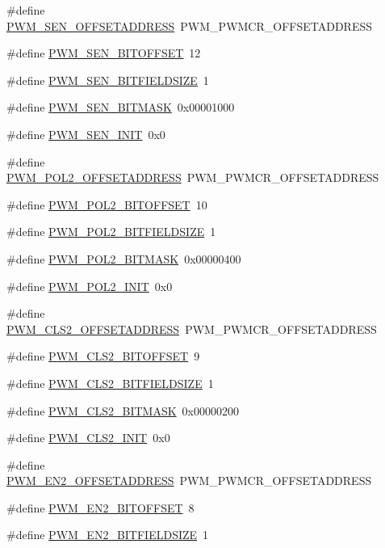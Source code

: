 \begin{DoxyCompactItemize}
\#define \hyperlink{a00565_a1b7f936a7649c7f0768376f5b1708791}{PWM\_\-SEN\_\-OFFSETADDRESS}~PWM\_\-PWMCR\_\-OFFSETADDRESS
\item 
\#define \hyperlink{a00565_a04ad96c43a0a475b6b58512e3a2751f1}{PWM\_\-SEN\_\-BITOFFSET}~12
\item 
\#define \hyperlink{a00565_af0d8ffbf5f63bfcce2096cb6647e6008}{PWM\_\-SEN\_\-BITFIELDSIZE}~1
\item 
\#define \hyperlink{a00565_a1c3b561c85f49b7baf11499691b807f7}{PWM\_\-SEN\_\-BITMASK}~0x00001000
\item 
\#define \hyperlink{a00565_a6320df8f16adebd9db7d8814d6eec919}{PWM\_\-SEN\_\-INIT}~0x0
\item 
\#define \hyperlink{a00565_a2e02d894047e60f171b47ce5c119b22e}{PWM\_\-POL2\_\-OFFSETADDRESS}~PWM\_\-PWMCR\_\-OFFSETADDRESS
\item 
\#define \hyperlink{a00565_abdd5c3d9c594895666d8876f4fa69d64}{PWM\_\-POL2\_\-BITOFFSET}~10
\item 
\#define \hyperlink{a00565_a747574ed13e6904f21e60943be324cdc}{PWM\_\-POL2\_\-BITFIELDSIZE}~1
\item 
\#define \hyperlink{a00565_aa306f679ffafcc67897c133927dc4910}{PWM\_\-POL2\_\-BITMASK}~0x00000400
\item 
\#define \hyperlink{a00565_aa558c9f963219dc5822698b93ef4f6d6}{PWM\_\-POL2\_\-INIT}~0x0
\item 
\#define \hyperlink{a00565_ad706dc65d2a9dfe96eea06384d13351f}{PWM\_\-CLS2\_\-OFFSETADDRESS}~PWM\_\-PWMCR\_\-OFFSETADDRESS
\item 
\#define \hyperlink{a00565_ae94efecdd4ec42d1aadc52684c9f2bf2}{PWM\_\-CLS2\_\-BITOFFSET}~9
\item 
\#define \hyperlink{a00565_aca1f4663b80ef5947b379df09e3b3433}{PWM\_\-CLS2\_\-BITFIELDSIZE}~1
\item 
\#define \hyperlink{a00565_ae3cf31d7a0097a1a0b0847a862df0376}{PWM\_\-CLS2\_\-BITMASK}~0x00000200
\item 
\#define \hyperlink{a00565_a87ea2c3888708644f116c7d264353d85}{PWM\_\-CLS2\_\-INIT}~0x0
\item 
\#define \hyperlink{a00565_a82c2a6a73b8bea0771bf6add0d32f143}{PWM\_\-EN2\_\-OFFSETADDRESS}~PWM\_\-PWMCR\_\-OFFSETADDRESS
\item 
\#define \hyperlink{a00565_af559c0fb6de2e23f4d380dda6d592c55}{PWM\_\-EN2\_\-BITOFFSET}~8
\item 
\#define \hyperlink{a00565_ad291377138c0354336fceeb9ed5d4cb5}{PWM\_\-EN2\_\-BITFIELDSIZE}~1
\item 

\end{DoxyCompactItemize}
